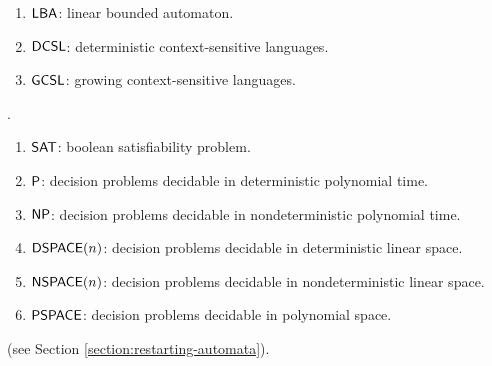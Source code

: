 \begin{enumerate}[]
\item $\textup{\sf LBA}$: linear bounded automaton.
\item $\textup{\sf DCSL}$: deterministic context-sensitive languages.
\item $\textup{\sf GCSL}$: growing context-sensitive languages.
\end{enumerate}

.

\begin{enumerate}[]
\item $\textup{\sf SAT}$: boolean satisfiability problem.
\item $\textup{\sf P}$: decision problems decidable in deterministic polynomial time.
\item $\textup{\sf NP}$: decision problems decidable in nondeterministic polynomial time.
\item $\textup{\sf DSPACE}(n)$: decision problems decidable in deterministic linear space.
\item $\textup{\sf NSPACE}(n)$: decision problems decidable in nondeterministic linear space.
\item $\textup{\sf PSPACE}$: decision problems decidable in polynomial space.
\end{enumerate}

 (see Section \ref{section:restarting-automata}).

